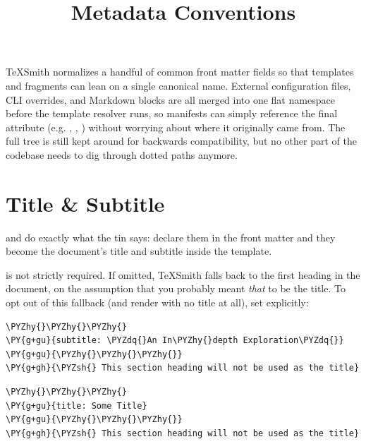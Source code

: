 \documentclass[a4paper,twoside]{article}
\title{Metadata Conventions}
\author{}\date{}
\begin{document}
\maketitle
TeXSmith normalizes a handful of common front matter fields so that templates and fragments can lean on a single canonical name. External configuration files, CLI  overrides, and Markdown  blocks are all merged into one flat namespace before the template resolver runs, so manifests can simply reference the final attribute (e.g. , , ) without worrying about where it originally came from. The full  tree is still kept around for backwards compatibility, but no other part of the codebase needs to dig through dotted  paths anymore.
\section{Title \& Subtitle}
 and  do exactly what the tin says: declare them in the front matter and they become the document's title and subtitle inside the template.

 is not strictly required. If omitted, TeXSmith falls back to the first heading in the document, on the assumption that you probably meant \emph{that} to be the title. To opt out of this fallback (and render with no title at all), set  explicitly:
\begin{tscode}[lang=md, engine=pygments]
\begin{Verbatim}[commandchars=\\\{\},breaklines, breakanywhere, commandchars=\\\{\}]
\PYZhy{}\PYZhy{}\PYZhy{}
\PY{g+gu}{subtitle: \PYZdq{}An In\PYZhy{}depth Exploration\PYZdq{}}
\PY{g+gu}{\PYZhy{}\PYZhy{}\PYZhy{}}
\PY{g+gh}{\PYZsh{} This section heading will not be used as the title}
\end{Verbatim}
\end{tscode}
\begin{tscode}[lang=md, engine=pygments]
\begin{Verbatim}[commandchars=\\\{\},breaklines, breakanywhere, commandchars=\\\{\}]
\PYZhy{}\PYZhy{}\PYZhy{}
\PY{g+gu}{title: Some Title}
\PY{g+gu}{\PYZhy{}\PYZhy{}\PYZhy{}}
\PY{g+gh}{\PYZsh{} This section heading will not be used as the title}
\end{Verbatim}
\end{tscode}
\end{document}
